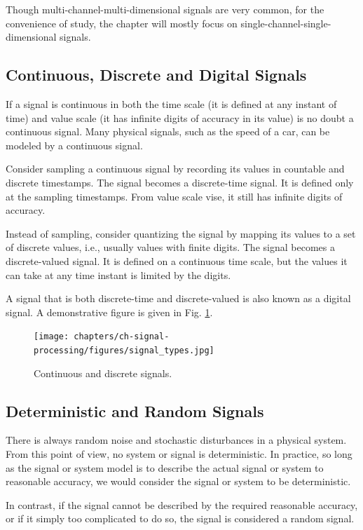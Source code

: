 Though multi-channel-multi-dimensional signals are very common, for the convenience of study, the chapter will mostly focus on single-channel-single-dimensional signals.

\subsection{Continuous, Discrete and Digital Signals}

If a signal is continuous in both the time scale (it is defined at any instant of time) and value scale (it has infinite digits of accuracy in its value) is no doubt a continuous signal. Many physical signals, such as the speed of a car, can be modeled by a continuous signal.

Consider sampling a continuous signal by recording its values in countable and discrete timestamps. The signal becomes a discrete-time signal. It is defined only at the sampling timestamps. From value scale vise, it still has infinite digits of accuracy.

Instead of sampling, consider quantizing the signal by mapping its values to a set of discrete values, i.e., usually values with finite digits. The signal becomes a discrete-valued signal. It is defined on a continuous time scale, but the values it can take at any time instant is limited by the digits.

A signal that is both discrete-time and discrete-valued is also known as a digital signal. A demonstrative figure is given in Fig. \ref{fig:signal_types}. 
\begin{figure}
	\centering
	\texttt{[image: chapters/ch-signal-processing/figures/signal\_types.jpg]}
	\caption{Continuous and discrete signals.} \label{fig:signal_types}
\end{figure}

\subsection{Deterministic and Random Signals}

There is always random noise and stochastic disturbances in a physical system. From this point of view, no system or signal is deterministic. In practice, so long as the signal or system model is to describe the actual signal or system to reasonable accuracy, we would consider the signal or system to be deterministic.

In contrast, if the signal cannot be described by the required reasonable accuracy, or if it simply too complicated to do so, the signal is considered a random signal.

